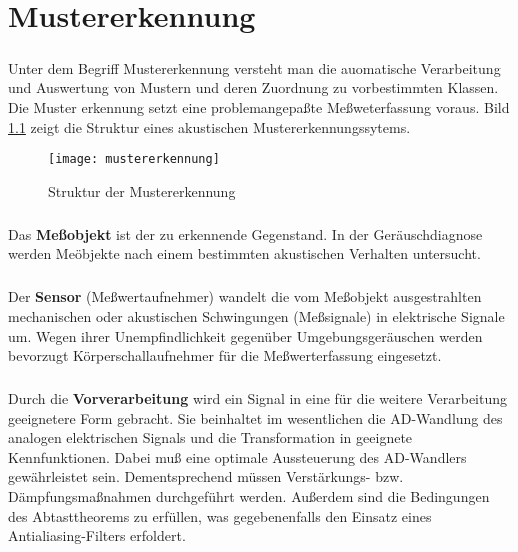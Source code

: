 \chapter{Mustererkennung}

\paragraph{}
Unter dem Begriff Mustererkennung versteht man die auomatische Verarbeitung und
Auswertung von Mustern und deren Zuordnung zu vorbestimmten Klassen. Die Muster%
erkennung setzt eine problemangepa\ss{}te Me\ss{}weterfassung voraus. Bild
\ref{fig:mustererkennung} zeigt die Struktur eines akustischen
Mustererkennungssytems.

\begin{figure}[ht]
\centering
\texttt{[image: mustererkennung]}
\caption{Struktur der Mustererkennung}
\label{fig:mustererkennung}
\end{figure}

\paragraph{}
Das \textbf{Me\ss{}objekt} ist der zu erkennende Gegenstand. In der 
Ger\"auschdiagnose werden Me\"objekte nach einem bestimmten akustischen
Verhalten untersucht.

\paragraph{}
Der \textbf{Sensor} (Me\ss{}wertaufnehmer) wandelt die vom Me\ss{}objekt
ausgestrahlten mechanischen oder akustischen Schwingungen (Me\ss{}signale) in
elektrische Signale um. Wegen ihrer Unempfindlichkeit gegen\"uber
Umgebungsger\"auschen werden bevorzugt K\"orperschallaufnehmer f\"ur die
Me\ss{}werterfassung eingesetzt.

\paragraph{}
Durch die \textbf{Vorverarbeitung} wird ein Signal in eine f\"ur die weitere
Verarbeitung geeignetere Form gebracht. Sie beinhaltet im wesentlichen die
AD-Wandlung des analogen elektrischen Signals und die Transformation in
geeignete Kennfunktionen. Dabei mu\ss{} eine optimale Aussteuerung des
AD-Wandlers gew\"ahrleistet sein. Dementsprechend m\"ussen Verst\"arkungs-
bzw. D\"ampfungsma\ss{}nahmen durchgef\"uhrt werden. Au\ss{}erdem sind die
Bedingungen des Abtasttheorems zu erf\"ullen, was gegebenenfalls den Einsatz
eines Antialiasing-Filters erfoldert.

